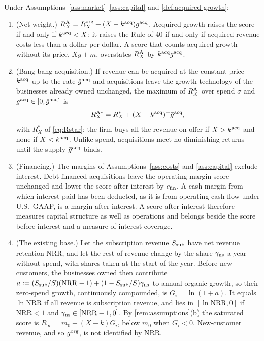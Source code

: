 \begin{proposition}\label{prop:acquired-score}
Under Assumptions~\ref{ass:market}--\ref{ass:capital} and \autoref{def:acquired-growth}:
\begin{enumerate}
\item[(a)] (Net weight.) $R^{\rm A}_X=R^{\rm org}_X+(X-k^{\rm acq})g^{\rm acq}$. Acquired growth raises the score if and only if $k^{\rm acq}<X$; it raises the Rule of 40 if and only if acquired revenue costs less than a dollar per dollar. A score that counts acquired growth without its price, $Xg+m$, overstates $R^{\rm A}_X$ by $k^{\rm acq}g^{\rm acq}$.
\item[(b)] (Bang-bang acquisition.) If revenue can be acquired at the constant price $k^{\rm acq}$ up to the rate $\bar g^{\rm acq}$ and acquisitions leave the growth technology of the businesses already owned unchanged, the maximum of $R^{\rm A}_X$ over spend $\sigma$ and $g^{\rm acq}\in[0,\bar g^{\rm acq}]$ is
\begin{equation}\label{eq:acquired-Rstar}
R^{\rm A*}_X=R^*_X+(X-k^{\rm acq})^+\bar g^{\rm acq},
\end{equation}
with $R^*_X$ of \eqref{eq:Rstar}: the firm buys all the revenue on offer if $X>k^{\rm acq}$ and none if $X<k^{\rm acq}$. Unlike spend, acquisitions meet no diminishing returns until the supply $\bar g^{\rm acq}$ binds.
\item[(c)] (Financing.) The margins of Assumptions~\ref{ass:costs} and \ref{ass:capital} exclude interest. Debt-financed acquisitions leave the operating-margin score unchanged and lower the score after interest by $c_{\rm fin}$. A cash margin from which interest paid has been deducted, as it is from operating cash flow under U.S.\ GAAP, is a margin after interest. A score after interest therefore measures capital structure as well as operations and belongs beside the score before interest and a measure of interest coverage.
\item[(d)] (The existing base.) Let the subscription revenue $S_{\rm sub}$ have net revenue retention $\mathrm{NRR}$, and let the rest of revenue change by the share $\gamma_{\rm ns}$ a year without spend, with shares taken at the start of the year. Before new customers, the businesses owned then contribute $a:=(S_{\rm sub}/S)(\mathrm{NRR}-1)+(1-S_{\rm sub}/S)\gamma_{\rm ns}$ to annual organic growth, so their zero-spend growth, continuously compounded, is $G_i=\ln(1+a)$. It equals $\ln\mathrm{NRR}$ if all revenue is subscription revenue, and lies in $[\ln\mathrm{NRR},0]$ if $\mathrm{NRR}<1$ and $\gamma_{\rm ns}\in[\mathrm{NRR}-1,0]$. By \autoref{rem:assumptions}(b) the saturated score is $R_\infty=m_0+(X-k)G_i$, below $m_0$ when $G_i<0$. New-customer revenue, and so $g^{\rm org}$, is not identified by NRR.

\end{enumerate}
\end{proposition}
